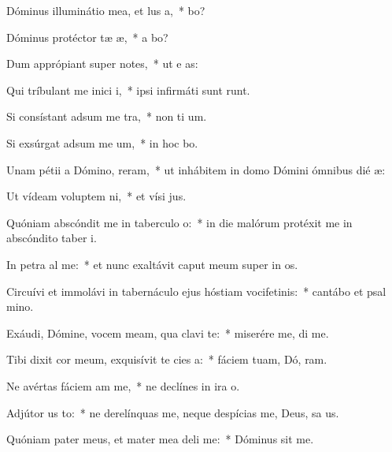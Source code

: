 \item Dóminus illuminátio mea, et lus a,~*  bo?
\item Dóminus protéctor tæ æ,~* a  bo?
\item Dum apprópiant super  notes,~* ut e  as:
\item Qui tríbulant me inici i,~* ipsi infirmáti sunt  runt.
\item Si consístant adsum me tra,~* non ti  um.
\item Si exsúrgat adsum me um,~* in hoc  bo.
\item Unam pétii a Dómino,  reram,~* ut inhábitem in domo Dómini ómnibus dié  æ:
\item Ut vídeam voluptem ni,~* et vísi  jus.
\item Quóniam abscóndit me in taberculo o:~* in die malórum protéxit me in abscóndito taber i.
\item In petra al me:~* et nunc exaltávit caput meum super in os.
\item Circuívi et immolávi in tabernáculo ejus hóstiam vocifetinis:~* cantábo et psal  mino.
\item Exáudi, Dómine, vocem meam, qua clavi  te:~* miserére me,  di me.
\item Tibi dixit cor meum, exquisívit te cies a:~* fáciem tuam, Dó, ram.
\item Ne avértas fáciem am  me,~* ne declínes in ira   o.
\item Adjútor us to:~* ne derelínquas me, neque despícias me, Deus, sa us.
\item Quóniam pater meus, et mater mea deli me:~* Dóminus  sit me.

